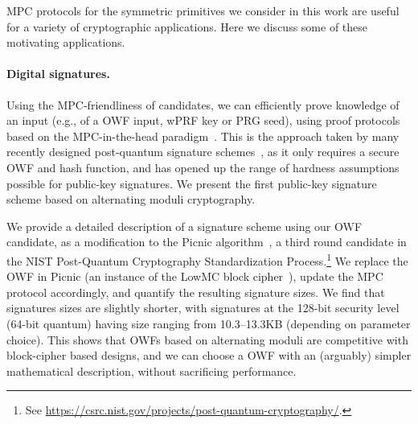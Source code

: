 MPC protocols for the symmetric primitives we consider in this work are useful for a variety of cryptographic applications. Here we discuss some of these motivating applications. 

\paragraph{Digital signatures.} Using the MPC-friendliness of candidates, we can efficiently prove knowledge of
an input (e.g., of a OWF input, wPRF key or PRG seed), using proof protocols
based on the MPC-in-the-head paradigm~\cite{ishai2007-zkmpc}.  This is the approach
taken by many recently designed post-quantum signature
schemes~\cite{chase2017-picnic,CCS:KatKolWan18,beullens2020-sigma-mq,beullens2020-legroast,guilhem2019-bbq,banquet},
as it only requires a secure OWF and hash function, and has opened up the range
of hardness assumptions possible for public-key signatures.  We present the
first public-key signature scheme based on alternating moduli cryptography. 

We provide a detailed description of a signature scheme using our OWF candidate,
as a modification to the Picnic
algorithm~\cite{chase2017-picnic,CCS:KatKolWan18,kales2020-picnic,picnic-spec}, a
third round candidate in the NIST Post-Quantum Cryptography Standardization
Process.\footnote{See
\url{https://csrc.nist.gov/projects/post-quantum-cryptography/}.} We replace
the OWF in Picnic (an instance of the LowMC block cipher~\cite{albrecht2015-lowmc}),
update the MPC protocol accordingly, and quantify the resulting signature
sizes.  We find that signatures sizes are slightly shorter, with signatures at
the 128-bit security level (64-bit quantum) having size ranging from 10.3--13.3KB (depending
on parameter choice).  This
shows that OWFs based on alternating moduli are competitive with block-cipher
based designs, and we can choose a OWF with an (arguably) simpler mathematical
description, without sacrificing performance. 


